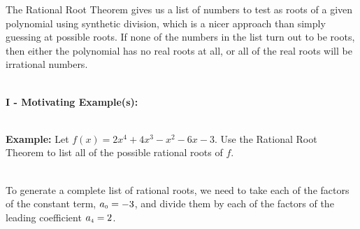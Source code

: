 \documentclass[12pt]{article}
\theoremstyle{definition}
\begin{document}
The Rational Root Theorem gives us a list of numbers to test as roots of a given polynomial using synthetic division, which is a nicer approach than simply guessing at possible roots.  If none of the numbers in the list turn out to be roots, then either the polynomial has no real roots at all, or all of the real roots will be irrational numbers.\\
\ \par
{\bf I - Motivating Example(s):}\\
\ \par
{\bf Example:} Let $f(x) = 2x^4+4x^3-x^2-6x-3$. Use the Rational Root Theorem to list all of the possible rational roots of $f$.\\
\ \par
To generate a complete list of rational roots, we need to take each of the factors of the constant term, $a_{\mbox{\tiny$0$}} = -3$, and divide them by each of the factors of the leading coefficient $a_{\mbox{\tiny$4$}} = 2$.
\pagebreak
\end{document}
